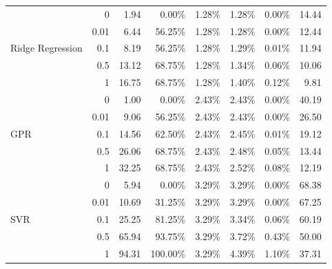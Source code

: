 \begin{table}[!ht]
\begin{tabular}{lrrrrrrr}
		\midrule
		\multirow{5}{*}{Ridge Regression} & 0    & 1.94  & 0.00\%   & 1.28\% & 1.28\% & 0.00\% & 14.44 \\
		                                  & 0.01 & 6.44  & 56.25\%  & 1.28\% & 1.28\% & 0.00\% & 12.44 \\
		                                  & 0.1  & 8.19  & 56.25\%  & 1.28\% & 1.29\% & 0.01\% & 11.94 \\
		                                  & 0.5  & 13.12 & 68.75\%  & 1.28\% & 1.34\% & 0.06\% & 10.06 \\
		                                  & 1    & 16.75 & 68.75\%  & 1.28\% & 1.40\% & 0.12\% & 9.81  \\
		\midrule
		\multirow{5}{*}{GPR}              & 0    & 1.00  & 0.00\%   & 2.43\% & 2.43\% & 0.00\% & 40.19 \\
		                                  & 0.01 & 9.06  & 56.25\%  & 2.43\% & 2.43\% & 0.00\% & 26.50 \\
		                                  & 0.1  & 14.56 & 62.50\%  & 2.43\% & 2.45\% & 0.01\% & 19.12 \\
		                                  & 0.5  & 26.06 & 68.75\%  & 2.43\% & 2.48\% & 0.05\% & 13.44 \\
		                                  & 1    & 32.25 & 68.75\%  & 2.43\% & 2.52\% & 0.08\% & 12.19 \\
		\midrule
		\multirow{5}{*}{SVR}              & 0    & 5.94  & 0.00\%   & 3.29\% & 3.29\% & 0.00\% & 68.38 \\
		                                  & 0.01 & 10.69 & 31.25\%  & 3.29\% & 3.29\% & 0.00\% & 67.25 \\
		                                  & 0.1  & 25.25 & 81.25\%  & 3.29\% & 3.34\% & 0.06\% & 60.19 \\
		                                  & 0.5  & 65.94 & 93.75\%  & 3.29\% & 3.72\% & 0.43\% & 50.00 \\
		                                  & 1    & 94.31 & 100.00\% & 3.29\% & 4.39\% & 1.10\% & 37.31 \\
		\bottomrule
	\end{tabular}
	\label{tab:selection_sensitivity}
\end{table}
